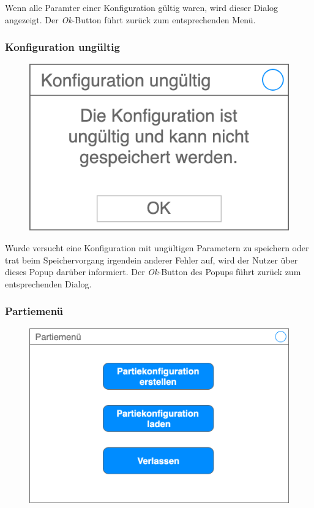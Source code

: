     Wenn alle Paramter einer Konfiguration gültig waren, wird dieser Dialog angezeigt. Der \textit{Ok}-Button führt zurück zum entsprechenden Menü.

    \subsubsection{Konfiguration ungültig}

    \begin{figure}[H]
        \centering
        \includegraphics[width=\textwidth/2]{images/konfiguration_ungueltig}
    \end{figure}

    Wurde versucht eine Konfiguration mit ungültigen Parametern zu speichern oder trat beim Speichervorgang irgendein anderer Fehler auf, wird der Nutzer über dieses Popup darüber informiert. Der \textit{Ok}-Button des Popups führt zurück zum entsprechenden Dialog.

    \subsubsection{Partiemenü}

    \begin{figure}[H]
        \centering
        \includegraphics[width=\textwidth/2]{images/partiemenue}
    \end{figure}

